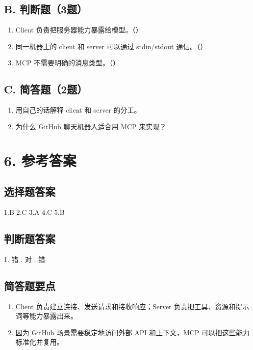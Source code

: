 \documentclass[UTF8,a4paper,11pt]{ctexart}
\begin{document}
\subsection*{B. 判断题（3题）}
\begin{enumerate}
  \item Client 负责把服务器能力暴露给模型。（\quad）
  \item 同一机器上的 client 和 server 可以通过 stdin/stdout 通信。（\quad）
  \item MCP 不需要明确的消息类型。（\quad）
\end{enumerate}

\subsection*{C. 简答题（2题）}
\begin{enumerate}
  \item 用自己的话解释 client 和 server 的分工。
  \item 为什么 GitHub 聊天机器人适合用 MCP 来实现？
\end{enumerate}

\section*{6. 参考答案}
\subsection*{选择题答案}
1.B \quad 2.C \quad 3.A \quad 4.C \quad 5.B

\subsection*{判断题答案}
1. 错 . 对 . 错

\subsection*{简答题要点}
\begin{enumerate}
  \item Client 负责建立连接、发送请求和接收响应；Server 负责把工具、资源和提示词等能力暴露出来。
  \item 因为 GitHub 场景需要稳定地访问外部 API 和上下文，MCP 可以把这些能力标准化并复用。
\end{enumerate}
\end{document}
